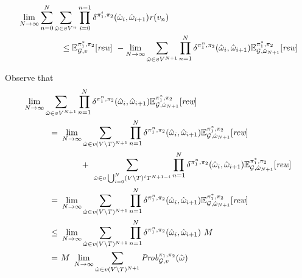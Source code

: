 \begin{myproof}
  \begin{align}
    & \lim_{N \rightarrow \infty} \sum^{N}_{n=0}\sum_{\hat{\omega} \in vV^{n}} \prod^{n-1}_{i=0}\delta^{\pi_{1}^i,\pi_{2}}(\hat{\omega}_i, \hat{\omega}_{i+1}) \mathit{r}(v_n) \label{th:semimarkov-to-memoryless-eq0}\\
    & \hspace{5em} \leq 
      \mathbb{E}^{\pi^*_{1}, \pi_{2}}_{\mathcal{G},v}[\textit{rew}] \ - \lim_{N \rightarrow \infty} \sum_{\hat{\omega} \in vV^{N+1}}\prod^{N}_{n=1}\delta^{\pi_{1}^n,\pi_{2}}(\hat{\omega}_i,\hat{\omega}_{i+1}) \mathbb{E}^{\pi^*_{1}, \pi_{2}}_{\mathcal{G}, \hat{\omega}_{N+1}}[\textit{rew}] \notag
  \end{align}

  Observe that
  \begin{align}
    \lim_{N \rightarrow \infty} \sum_{\hat{\omega} \in vV^{N+1}}\prod^{N}_{n=1}\delta^{\strat{1}^n,\strat{2}}(\hat{\omega}_i,\hat{\omega}_{i+1}) \Expect{\starredstrat{1}}{\strat{2}}_{\StochG, \hat{\omega}_{N+1}}[\Rewards] \hspace{-16em} & \notag \\
    = \ & \lim_{N \rightarrow \infty} \sum_{\hat{\omega} \in v(V\setminus T)^{N+1}}\prod^{N}_{n=1}\delta^{\strat{1}^n,\strat{2}}(\hat{\omega}_i,\hat{\omega}_{i+1}) \Expect{\starredstrat{1}}{\strat{2}}_{\StochG, \hat{\omega}_{N+1}}[\Rewards] \label{th:semimarkov-to-memoryless-lim-eq1}\\
    & \phantom{\lim_{N \rightarrow \infty}} + \
    \sum_{\hat{\omega} \in v\bigcup_{i=0}^N(V\setminus T)^iT^{N+1-i}}\prod^{N}_{n=1}\delta^{\strat{1}^n,\strat{2}}(\hat{\omega}_i,\hat{\omega}_{i+1}) \Expect{\starredstrat{1}}{\strat{2}}_{\StochG, \hat{\omega}_{N+1}}[\Rewards] \notag \\
    = \ & \lim_{N \rightarrow \infty} \sum_{\hat{\omega} \in v(V\setminus T)^{N+1}}\prod^{N}_{n=1}\delta^{\strat{1}^n,\strat{2}}(\hat{\omega}_i,\hat{\omega}_{i+1}) \Expect{\starredstrat{1}}{\strat{2}}_{\StochG, \hat{\omega}_{N+1}}[\Rewards] \label{th:semimarkov-to-memoryless-lim-eq2}\\
    \leq \ & \lim_{N \rightarrow \infty} \sum_{\hat{\omega} \in v(V\setminus T)^{N+1}}\prod^{N}_{n=1}\delta^{\strat{1}^n,\strat{2}}(\hat{\omega}_i,\hat{\omega}_{i+1}) \ M \label{th:semimarkov-to-memoryless-lim-eq3}\\
    = \ & M \ \lim_{N \rightarrow \infty} \sum_{\hat{\omega} \in v(V\setminus T)^{N+1}} \Prob{\strat{1}}{\strat{2}}_{\StochG,v}(\hat{\omega}) \label{th:semimarkov-to-memoryless-lim-eq4}\\

\end{align}
\end{myproof}
